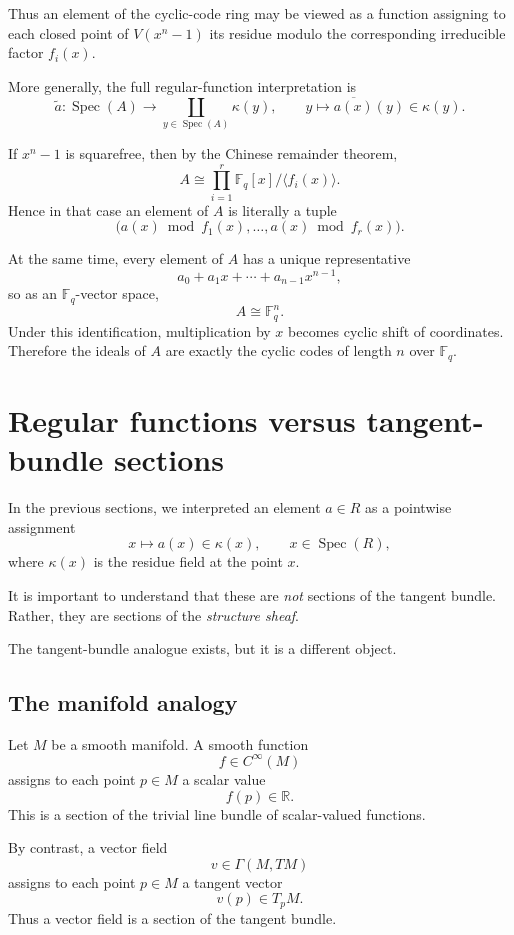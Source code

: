 \documentclass[11pt]{article}
\theoremstyle{definition}
\newcommand{\F}{\mathbb{F}}
\newcommand{\Spec}{\operatorname{Spec}}
\newcommand{\kk}[1]{\kappa\!\left(#1\right)}
\newcommand{\ideal}[1]{\langle #1\rangle}
\newcommand{\ol}[1]{\overline{#1}}
\begin{document}
Thus an element of the cyclic-code ring may be viewed as a function assigning to each closed point of \(V(x^n-1)\) its residue modulo the corresponding irreducible factor \(f_i(x)\).

More generally, the full regular-function interpretation is
\[
\widetilde a:\Spec(A)\longrightarrow \coprod_{y\in \Spec(A)}\kk{y},
\qquad
y\longmapsto \ol{a(x)}(y)\in \kk{y}.
\]

If \(x^n-1\) is squarefree, then by the Chinese remainder theorem,
\[
A\cong \prod_{i=1}^r \F_q[x]/\ideal{f_i(x)}.
\]
Hence in that case an element of \(A\) is literally a tuple
\[
\bigl(a(x)\bmod f_1(x),\dots,a(x)\bmod f_r(x)\bigr).
\]

At the same time, every element of \(A\) has a unique representative
\[
a_0+a_1x+\cdots+a_{n-1}x^{n-1},
\]
so as an \(\F_q\)-vector space,
\[
A\cong \F_q^n.
\]
Under this identification, multiplication by \(x\) becomes cyclic shift of coordinates. Therefore the ideals of \(A\) are exactly the cyclic codes of length \(n\) over \(\F_q\).

\newpage


\section{Regular functions versus tangent-bundle sections}

In the previous sections, we interpreted an element \(a\in R\) as a pointwise assignment
\[
x\longmapsto a(x)\in \kk{x},
\qquad x\in \Spec(R),
\]
where \(\kk{x}\) is the residue field at the point \(x\).

It is important to understand that these are \emph{not} sections of the tangent bundle.  
Rather, they are sections of the \emph{structure sheaf}.

The tangent-bundle analogue exists, but it is a different object.

\subsection{The manifold analogy}

Let \(M\) be a smooth manifold. A smooth function
\[
f\in C^\infty(M)
\]
assigns to each point \(p\in M\) a scalar value
\[
f(p)\in \mathbb{R}.
\]
This is a section of the trivial line bundle of scalar-valued functions.

By contrast, a vector field
\[
v\in \Gamma(M,TM)
\]
assigns to each point \(p\in M\) a tangent vector
\[
v(p)\in T_pM.
\]
Thus a vector field is a section of the tangent bundle.
\end{document}

